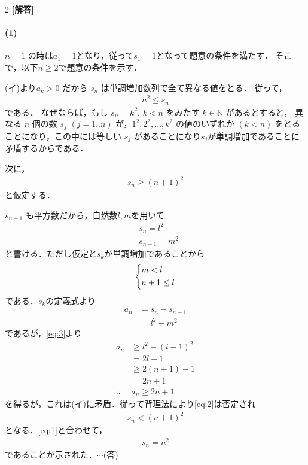 \documentclass[../../main.tex]{subfiles}
\begin{document}
\setcounter{equation}{0}
\begin{oframed}
  
\end{oframed}
\setlength{\columnseprule}{0.4pt}
\begin{multicols}{2}
  {\bf [解答]}
  \paragraph{(1)}
  $n=1$ の時は$a_1=1$となり，従って$s_1=1$となって題意の条件を満たす．
  そこで，以下$n \ge 2$で題意の条件を示す．

  (イ)より$a_k > 0$ だから $s_n$ は単調増加数列で全て異なる値をとる．
  従って，
  \begin{align}
    n^2 \le s_n \label{eq:1}
  \end{align}
  である．
  なぜならば，もし $s_n = k^2$, $k < n$ をみたす $k \in \mathbb{N}$ があるとすると，
  異なる $n$ 個の数
  $s_j$ $(j=1..n)$ が，$1^2, 2^2, \dots, k^2$ の値のいずれか $(k<n)$ をとる
  ことになり，この中には等しい $s_j$ があることになり$s_j$が単調増加であることに矛盾するからである．

  次に，
  \begin{align}
    s_n \ge (n+1)^2 \label{eq:2}
  \end{align}
  と仮定する．

  $s_{n-1}$ も平方数だから，自然数$l,m$を用いて
  \begin{align}
    & s_n = l^2     \\
    & s_{n-1} = m^2
  \end{align}
  と書ける．ただし仮定と$s_{k}$が単調増加であることから
  \begin{align}
    \begin{dcases}
      m < l \\
      n+1 \le l
    \end{dcases} \label{eq:3}
  \end{align}
  である．$s_k$の定義式より
  \begin{align}
    a_n
    & = s_n - s_{n-1} \\
    & = l^2 -m^2
  \end{align}
  であるが，\cref{eq:3}より
  \begin{align}
    a_n
    & \ge l^2 - (l-1)^2 \\
    & = 2l -1         \\
    & \ge 2(n+1) -1   \\
    & = 2n+1          \\
    \therefore
    & a_n \ge 2n+1
  \end{align}
  を得るが，これは(イ)に矛盾．従って背理法により\cref{eq:2}は否定され
  \begin{align}
    s_n < (n+1)^2
  \end{align}
  となる．\cref{eq:1}と合わせて，
  \begin{align}
    s_n = n^2
  \end{align}
  であることが示された．$\cdots$(答)


\end{multicols}
\end{document}
